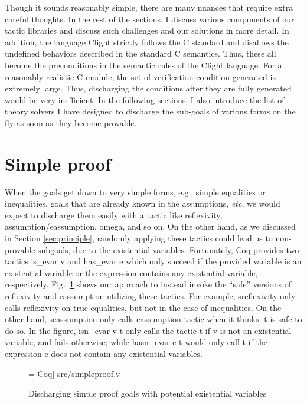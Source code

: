 Though it sounds reasonably simple, there are many nuances that require extra
careful thoughts. 
In the rest of the sections, I discuss various components of our tactic libraries
and discuss such challenges and our solutions in more detail.
In addition, the language Clight strictly follows the C standard and disallows the
undefined behaviors described in the standard C semantics. Thus, these all
become the preconditions in the semantic rules of the Clight language. For a
reasonably realistic C module, the set of verification condition generated is
extremely large. Thus, discharging the conditions after they are fully generated
would be very inefficient. In the following sections, I also introduce the list of
theory solvers I have designed to discharge the sub-goals of various forms
on the fly as soon as they become provable.


\section{Simple proof}

When the goals get down to very simple forms, e.g., simple equalities or inequalities,
goals that are already known in the assumptions, {\it etc}, we would expect to
discharge them easily with a tactic like \textsf{reflexivity}, \textsf{assumption/eassumption},
\textsf{omega}, and so on. On the other hand, as we discussed in Section \ref{sec:principle},
randomly applying these tactics could lead us to non-provable subgoals, due to the
existential variables. Fortunately, Coq provides two tactics \textsf{is\_evar v}
and \textsf{has\_evar e} which only succeed if the provided variable is an existential
variable or the expression contains any existential variable, respectively.
Fig.~\ref{fig:simpleproof} shows our approach to instead invoke the ``safe'' versions
of \textsf{reflexivity} and \textsf{eassumption} utilizing these tactics.
For example, \textsf{sreflexivity} only calls \textsf{reflexivity} on true equalities,
but not in the case of inequalities. On the other hand, \textsf{seassumption}
only calls \textsf{eassumption} tactic when it thinks it is safe to do so.
In the figure, \textsf{isn\_evar v t} only calls the tactic t if \textsf{v} is not
an existential variable, and fails otherwise; while \textsf{hasn\_evar e t} would only
call \textsf{t} if the expression \textsf{e} does not contain any existential variables.

\begin{figure}
 = Coq] {src/simpleproof.v}
\caption{Discharging simple proof goals with potential existential variables}
\label{fig:simpleproof}
\end{figure}

